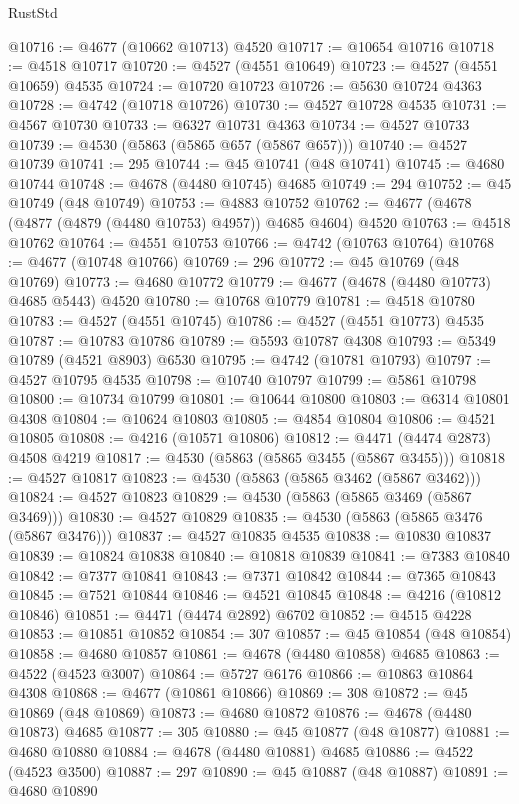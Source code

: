 \begin{lexlean}{RustStd}
\begin{coremodule}
@10716 := @4677 (@10662 @10713) @4520
@10717 := @10654 @10716
@10718 := @4518 @10717
@10720 := @4527 (@4551 @10649)
@10723 := @4527 (@4551 @10659) @4535
@10724 := @10720 @10723
@10726 := @5630 @10724 @4363
@10728 := @4742 (@10718 @10726)
@10730 := @4527 @10728 @4535
@10731 := @4567 @10730
@10733 := @6327 @10731 @4363
@10734 := @4527 @10733
@10739 := @4530 (@5863 (@5865 @657 (@5867 @657)))
@10740 := @4527 @10739
@10741 := 295
@10744 := @45 @10741 (@48 @10741)
@10745 := @4680 @10744
@10748 := @4678 (@4480 @10745) @4685
@10749 := 294
@10752 := @45 @10749 (@48 @10749)
@10753 := @4883 @10752
@10762 := @4677 (@4678 (@4877 (@4879 (@4480 @10753) @4957)) @4685 @4604) @4520
@10763 := @4518 @10762
@10764 := @4551 @10753
@10766 := @4742 (@10763 @10764)
@10768 := @4677 (@10748 @10766)
@10769 := 296
@10772 := @45 @10769 (@48 @10769)
@10773 := @4680 @10772
@10779 := @4677 (@4678 (@4480 @10773) @4685 @5443) @4520
@10780 := @10768 @10779
@10781 := @4518 @10780
@10783 := @4527 (@4551 @10745)
@10786 := @4527 (@4551 @10773) @4535
@10787 := @10783 @10786
@10789 := @5593 @10787 @4308
@10793 := @5349 @10789 (@4521 @8903) @6530
@10795 := @4742 (@10781 @10793)
@10797 := @4527 @10795 @4535
@10798 := @10740 @10797
@10799 := @5861 @10798
@10800 := @10734 @10799
@10801 := @10644 @10800
@10803 := @6314 @10801 @4308
@10804 := @10624 @10803
@10805 := @4854 @10804
@10806 := @4521 @10805
@10808 := @4216 (@10571 @10806)
@10812 := @4471 (@4474 @2873) @4508 @4219
@10817 := @4530 (@5863 (@5865 @3455 (@5867 @3455)))
@10818 := @4527 @10817
@10823 := @4530 (@5863 (@5865 @3462 (@5867 @3462)))
@10824 := @4527 @10823
@10829 := @4530 (@5863 (@5865 @3469 (@5867 @3469)))
@10830 := @4527 @10829
@10835 := @4530 (@5863 (@5865 @3476 (@5867 @3476)))
@10837 := @4527 @10835 @4535
@10838 := @10830 @10837
@10839 := @10824 @10838
@10840 := @10818 @10839
@10841 := @7383 @10840
@10842 := @7377 @10841
@10843 := @7371 @10842
@10844 := @7365 @10843
@10845 := @7521 @10844
@10846 := @4521 @10845
@10848 := @4216 (@10812 @10846)
@10851 := @4471 (@4474 @2892) @6702
@10852 := @4515 @4228
@10853 := @10851 @10852
@10854 := 307
@10857 := @45 @10854 (@48 @10854)
@10858 := @4680 @10857
@10861 := @4678 (@4480 @10858) @4685
@10863 := @4522 (@4523 @3007)
@10864 := @5727 @6176
@10866 := @10863 @10864 @4308
@10868 := @4677 (@10861 @10866)
@10869 := 308
@10872 := @45 @10869 (@48 @10869)
@10873 := @4680 @10872
@10876 := @4678 (@4480 @10873) @4685
@10877 := 305
@10880 := @45 @10877 (@48 @10877)
@10881 := @4680 @10880
@10884 := @4678 (@4480 @10881) @4685
@10886 := @4522 (@4523 @3500)
@10887 := 297
@10890 := @45 @10887 (@48 @10887)
@10891 := @4680 @10890

\end{coremodule}
\end{lexlean}
